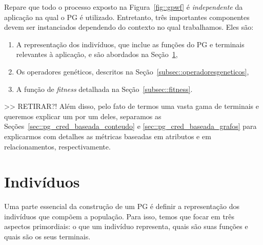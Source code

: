 
Repare que todo o processo exposto na Figura~\ref{fig::gpwf} é \textit{independente} da aplicação na qual o \textsc{PG} é utilizado. 
Entretanto, três importantes componentes devem ser instanciados dependendo do contexto no qual trabalhamos. Eles são:
\begin{enumerate}
\item A representação dos indivíduos, que inclue as funções do \textsc{PG} e terminais relevantes à aplicação, e são abordados na Seção~\ref{subsec::individuos}, 
\item Os operadores genéticos, descritos na Seção~\ref{subsec::operadoresgeneticos},
\item A função de \textit{fitness} detalhada na Seção~\ref{subsec::fitness}.
\end{enumerate}
>> RETIRAR?! Além disso, pelo fato de termos uma vasta gama de terminais e queremos explicar um por um deles, separamos as Seções~\ref{sec::pg_cred_baseada_conteudo} e \ref{sec::pg_cred_baseada_grafos} para explicarmos com detalhes as métricas baseadas em atributos e em relacionamentos, respectivamente.

\section{Indivíduos}
\label{subsec::individuos}

Uma parte essencial da construção de um \textsc{PG} é definir a representação dos indivíduos que compõem a população.
Para isso, temos que focar em três aspectos primordiais: o que um indivíduo representa, quais são suas funções e quais são os seus terminais. 
 
